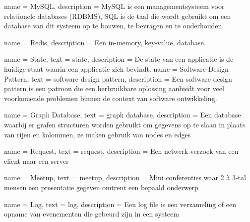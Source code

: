 


{
  name = MySQL,
  description = {MySQL is een managementsysteem voor relationele databases (\gls{RDBMS}), SQL is de taal die wordt gebruikt om een database van dit systeem op te bouwen, te bevragen en te onderhouden}
}

{
  name = Redis,
  description = {Een in-memory, key-value, database.}
}

{
  name = State,
  text = state,
  description = {De state van een applicatie is de huidige staat waarin een applicatie zich bevindt.}
}
{
  name = {Software Design Pattern},
  text = {software design pattern},
  description = {Een software design pattern is een patroon die een herbruikbare oplossing aanbiedt voor veel voorkomende problemen binnen de context van software ontwikkeling.}
}

{
  name = {Graph Database},
  text = {graph database},
  description = {Een database waarbij er grafen structuren worden gebruikt om gegevens op te slaan in plaats van rijen en kolommen, ze maken gebruik van nodes en edges}
}

{
  name = Request,
  text = request,
  description = {Een netwerk verzoek van een client naar een server}
}

{
  name = Meetup,
  text = meetup,
  description = {Mini conferenties waar 2 à 3-tal mensen een presentatie gegeven omtrent een bepaald onderwerp}
}

{
  name = Log,
  text = log,
  description = {Een log file is een verzameling of een opname van evenementen die gebeurd zijn in een systeem}
}

